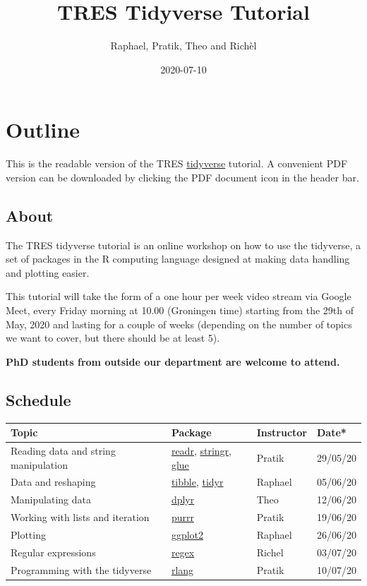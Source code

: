 \documentclass[]{book}
\title{TRES Tidyverse Tutorial}
\author{Raphael, Pratik, Theo and Richèl}
\date{2020-07-10}
\begin{document}
\maketitle


\linenumbers

{
\setcounter{tocdepth}{1}
\tableofcontents
}
\hypertarget{outline}{%
\chapter*{Outline}\label{outline}}

This is the readable version of the TRES \href{https://www.tidyverse.org/}{tidyverse} tutorial. A convenient PDF version can be downloaded by clicking the PDF document icon in the header bar.

\hypertarget{about}{%
\section*{About}\label{about}}

The TRES tidyverse tutorial is an online workshop on how to use the tidyverse, a set of packages in the R computing language designed at making data handling and plotting easier.

This tutorial will take the form of a one hour per week video stream via Google Meet, every Friday morning at 10.00 (Groningen time) starting from the 29th of May, 2020 and lasting for a couple of weeks (depending on the number of topics we want to cover, but there should be at least 5).

\textbf{PhD students from outside our department are welcome to attend.}

\hypertarget{schedule}{%
\section*{Schedule}\label{schedule}}

\begin{longtable}[]{@{}llll@{}}
\toprule
Topic & Package & Instructor & Date*\tabularnewline
\midrule
\endhead
Reading data and string manipulation & \href{https://readr.tidyverse.org/}{readr}, \href{https://stringr.tidyverse.org/}{stringr}, \href{https://github.com/tidyverse/glue}{glue} & Pratik & 29/05/20\tabularnewline
Data and reshaping & \href{https://tibble.tidyverse.org/}{tibble}, \href{https://tidyr.tidyverse.org/}{tidyr} & Raphael & 05/06/20\tabularnewline
Manipulating data & \href{https://dplyr.tidyverse.org/}{dplyr} & Theo & 12/06/20\tabularnewline
Working with lists and iteration & \href{https://purrr.tidyverse.org/}{purrr} & Pratik & 19/06/20\tabularnewline
Plotting & \href{https://ggplot2.tidyverse.org/}{ggplot2} & Raphael & 26/06/20\tabularnewline
Regular expressions & \href{https://stat.ethz.ch/R-manual/R-devel/library/base/html/regex.html}{regex} & Richel & 03/07/20\tabularnewline
Programming with the tidyverse & \href{https://rlang.r-lib.org/}{rlang} & Pratik & 10/07/20\tabularnewline
\bottomrule
\end{longtable}
\end{document}
